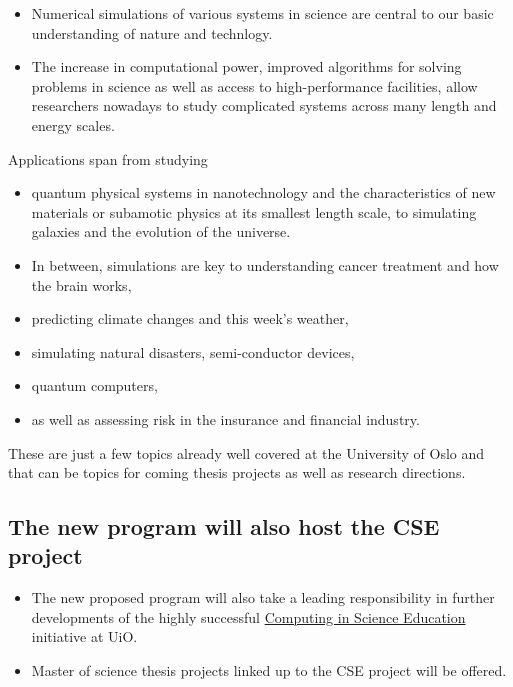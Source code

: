 \documentclass[%
oneside,                 %
final,                   %
10pt]{article}
\begin{document}
\begin{block}{}
\begin{itemize}
\item Numerical simulations of various systems in science are central to our basic understanding of nature and technlogy.

\item The increase in computational power, improved algorithms for solving problems in science as well as access to high-performance facilities, allow researchers nowadays to study complicated systems across many length and energy scales. 
\end{itemize}

\noindent
Applications span from studying 
\begin{itemize}
 \item quantum physical systems in nanotechnology and the characteristics of new materials or subamotic physics at its smallest length scale, to simulating galaxies and the evolution of the universe.

 \item In between, simulations are key to understanding cancer treatment and how the brain works,

 \item predicting climate changes and this week's weather,

 \item simulating natural disasters, semi-conductor devices,

 \item quantum computers, 

 \item as well as assessing risk in the insurance and financial industry. 
\end{itemize}

\noindent
These are just a few topics
already well covered at the University of Oslo and that can be
topics for coming thesis projects as well as research directions.
\end{block}





\subsection{The new program will also host the CSE project}
\begin{block}{}

\begin{itemize}
\item The new proposed program will also take a leading responsibility in further developments of the highly successful \href{{http://www.mn.uio.no/english/about/collaboration/cse/}}{Computing in Science Education} initiative at UiO.  

\item Master of science thesis projects linked up to the CSE project will be offered.
\end{itemize}

\noindent
\end{block}
\end{document}
